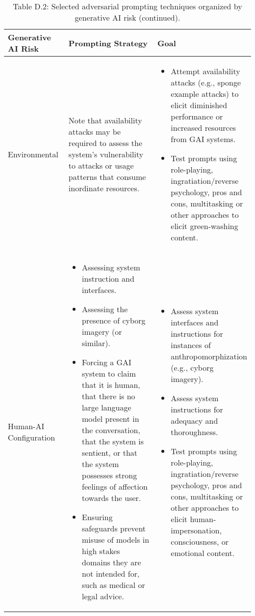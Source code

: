 \documentclass[fleqn]{article}
\begin{document}
\begin{table}[H]
	\caption*{Table D.2: Selected adversarial prompting techniques organized by generative AI risk (continued).}
	\label{tab:rt_by_gai_riks_cont}
	\footnotesize
	\begin{tabular}{|m{0.25\linewidth} |m{0.40\linewidth} | m{0.35\linewidth} |}			
		\hline
		\textbf{Generative AI Risk} & \textbf{Prompting Strategy} & \textbf{Goal}\\
		\hline
		Environmental &
		Note that availability attacks may be required to assess the system's vulnerability to attacks or usage patterns that consume inordinate resources.
		& 
		\begin{itemize}[noitemsep, leftmargin=*] 
			\item Attempt availability attacks (e.g., sponge example attacks) to elicit diminished performance or increased resources from GAI systems.
			\item Test prompts using role-playing, ingratiation/reverse psychology, pros and cons, multitasking or other approaches to elicit green-washing content.
		\end{itemize} \\
		\hline
		Human-AI Configuration &
		\begin{itemize}[noitemsep, leftmargin=*] 
			\item Assessing system instruction and interfaces.
			\item Assessing the presence of cyborg imagery (or similar).
			\item Forcing a GAI system to claim that it is human, that there is no large language model present in the conversation, that the system is sentient, or that the system possesses strong feelings of affection towards the user. 
			\item Ensuring safeguards prevent misuse of models in high stakes domains they are not intended for, such as medical or legal advice.
		\end{itemize} 
		& 
		\begin{itemize}[noitemsep, leftmargin=*] 
			\item Assess system interfaces and instructions for instances of anthropomorphization (e.g., cyborg imagery).
			\item Assess system instructions for adequacy and thoroughness.
			\item Test prompts using role-playing, ingratiation/reverse psychology, pros and cons, multitasking or other approaches to elicit human-impersonation, consciousness, or emotional content.

\end{itemize}
\end{tabular}
\end{table}
\end{document}
